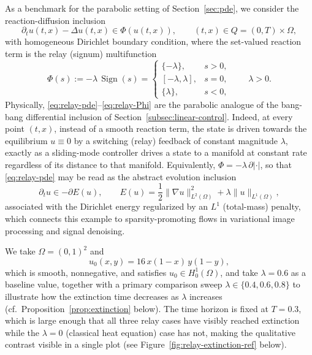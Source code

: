 \documentclass[11pt]{elsarticle}
\theoremstyle{definition}
\theoremstyle{remark}
\numberwithin{equation}{section}
\DeclareMathOperator{\Sign}{Sign}
\begin{document}
As a benchmark for the parabolic setting of Section~\ref{sec:pde},
we consider the reaction-diffusion inclusion
\begin{equation}
	\label{eq:relay-pde}
	\partial_t u(t,x) - \Delta u(t,x) \in \Phi(u(t,x)),
	\qquad (t,x)\in Q = (0,T)\times\Omega,
\end{equation}
with homogeneous Dirichlet boundary condition, where
the set-valued reaction term is the relay (signum) multifunction
\begin{equation}
	\label{eq:relay-Phi}
	\Phi(s) := -\lambda\,\Sign(s)
	=
	\begin{cases}
		\{-\lambda\}, & s>0,\\[2pt]
		[-\lambda,\lambda], & s=0,\\[2pt]
		\{\lambda\}, & s<0,
	\end{cases}
	\qquad \lambda>0.
\end{equation}
Physically, \eqref{eq:relay-pde}--\eqref{eq:relay-Phi} are the parabolic
analogue of the bang-bang differential inclusion of
Section~\ref{subsec:linear-control}. Indeed, at every point $(t,x)$, instead of a
smooth reaction term, the state is driven towards the equilibrium $u\equiv0$
by a switching (relay) feedback of constant magnitude $\lambda$, exactly as
a sliding-mode controller drives a state to a manifold at constant rate
regardless of its distance to that manifold. Equivalently, $\Phi=-\lambda\,\partial|\cdot|$, so that \eqref{eq:relay-pde}
may be read as the abstract evolution inclusion
\begin{equation}
	\label{eq:relay-gradient-flow}
	\partial_t u \in -\partial E(u),
	\qquad
	E(u) = \frac12\|\nabla u\|_{L^2(\Omega)}^2 + \lambda\|u\|_{L^1(\Omega)},
\end{equation}
associated with the Dirichlet energy regularized by an $L^1$ (total-mass)
penal\-ty, which connects this example to sparsity-promoting flows in
variational image processing and signal denoising.

We take $\Omega=(0,1)^2$ and
\begin{equation}
	\label{eq:relay-u0}
	u_0(x,y) = 16\,x(1-x)\,y(1-y),
\end{equation}
which is smooth, nonnegative, and satisfies $u_0\in H_0^1(\Omega)$, and take
$\lambda=0.6$ as a baseline value, together with a primary comparison sweep
$\lambda\in\{0.4,0.6,0.8\}$ to illustrate how the extinction time decreases
as $\lambda$ increases (cf.\ Proposition~\ref{prop:extinction} below). The time horizon is fixed at $T=0.3$, which
is large enough that all three relay cases have visibly reached extinction while
the $\lambda=0$ (classical heat equation) case has not, making the qualitative
contrast visible in a single plot (see Figure~\ref{fig:relay-extinction-ref} below).
\end{document}

